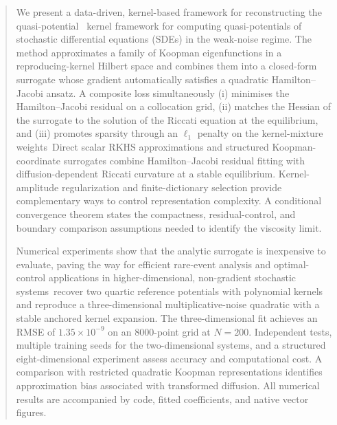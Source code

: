 \documentclass[11pt]{article}
\theoremstyle{plain}      %
\theoremstyle{definition} %
\providecommand{\DIFaddtex}[1]{{\protect\color{blue}#1}} %
\providecommand{\DIFdeltex}[1]{{\protect\color{red}#1}} %
\providecommand{\DIFaddbegin}{} %
\providecommand{\DIFaddend}{} %
\providecommand{\DIFdelbegin}{} %
\providecommand{\DIFdelend}{} %
\providecommand{\DIFadd}[1]{\texorpdfstring{\DIFaddtex{#1}}{#1}} %
\providecommand{\DIFdel}[1]{\texorpdfstring{\DIFdeltex{#1}}{}} %
\newcommand{\DIFscaledelfig}{1.0}
\newlength{\DIFdelgraphicswidth} %
\newlength{\DIFdelgraphicsheight} %
\newcommand{\DIFaddincludegraphics}[2][]{{\color{blue}\fbox{\DIFOincludegraphics[#1]{#2}}}} %
\newcommand{\DIFdelincludegraphics}[2][]{%
\sbox{\DIFdelgraphicsbox}{\DIFOincludegraphics[#1]{#2}}%
\settoboxwidth{\DIFdelgraphicswidth}{\DIFdelgraphicsbox} %
\settoboxtotalheight{\DIFdelgraphicsheight}{\DIFdelgraphicsbox} %
\scalebox{\DIFscaledelfig}{%
\parbox[b]{\DIFdelgraphicswidth}{\usebox{\DIFdelgraphicsbox}\\[-\baselineskip] \rule{\DIFdelgraphicswidth}{0em}}\llap{\resizebox{\DIFdelgraphicswidth}{\DIFdelgraphicsheight}{%
\setlength{\unitlength}{\DIFdelgraphicswidth}%
\begin{picture}(1,1)%
\thicklines\linethickness{2pt} %
{\color[rgb]{1,0,0}\put(0,0){\framebox(1,1){}}}%
{\color[rgb]{1,0,0}\put(0,0){\line( 1,1){1}}}%
{\color[rgb]{1,0,0}\put(0,1){\line(1,-1){1}}}%
\end{picture}%
}\hspace*{3pt}}} %
} %
\DeclareRobustCommand{\DIFaddbegin}{\DIFOaddbegin \let\includegraphics\DIFaddincludegraphics} %
\DeclareRobustCommand{\DIFaddend}{\DIFOaddend \let\includegraphics\DIFOincludegraphics} %
\DeclareRobustCommand{\DIFdelbegin}{\DIFOdelbegin \let\includegraphics\DIFdelincludegraphics} %
\DeclareRobustCommand{\DIFdelend}{\DIFOaddend \let\includegraphics\DIFOincludegraphics} %
\begin{document}
 
\begin{abstract}
We present a \DIFdelbegin \DIFdel{data-driven, kernel-based framework for reconstructing the quasi-potential }\DIFdelend\ \DIFaddbegin \DIFadd{kernel framework for computing quasi-potentials }\DIFaddend of stochastic differential equations \DIFdelbegin \DIFdel{(SDEs) }\DIFdelend in the weak-noise regime. \DIFdelbegin \DIFdel{The method approximates a family of Koopman eigenfunctions in a reproducing-kernel Hilbert space and combines them into a closed-form surrogate whose gradient automatically satisfies a quadratic Hamilton–Jacobi ansatz. A composite loss simultaneously (i) minimises the Hamilton–Jacobi residual on a collocation grid, (ii) matches the Hessian of the surrogate to the solution of the Riccati equation at the equilibrium, and (iii) promotes sparsity through an \(\ell_{1}\) penalty on the kernel-mixture weights}\DIFdelend\ \DIFaddbegin \DIFadd{Direct scalar RKHS approximations and structured Koopman-coordinate surrogates combine Hamilton--Jacobi residual fitting with diffusion-dependent Riccati curvature at a stable equilibrium. Kernel-amplitude regularization and finite-dictionary selection provide complementary ways to control representation complexity. A conditional convergence theorem states the compactness, residual-control, and boundary comparison assumptions needed to identify the viscosity limit}\DIFaddend .

Numerical experiments \DIFdelbegin \DIFdel{show that the analytic surrogate is inexpensive to evaluate, paving the way for efficient rare-event analysis and optimal-control applications in higher-dimensional, non-gradient stochastic systems}\DIFdelend\ \DIFaddbegin \DIFadd{recover two quartic reference potentials with polynomial kernels and reproduce a three-dimensional multiplicative-noise quadratic with a stable anchored kernel expansion. The three-dimensional fit achieves an RMSE of $1.35\times10^{-9}$ on an $8000$-point grid at $N=200$. Independent tests, multiple training seeds for the two-dimensional systems, and a structured eight-dimensional experiment assess accuracy and computational cost. A comparison with restricted quadratic Koopman representations identifies approximation bias associated with transformed diffusion. All numerical results are accompanied by code, fitted coefficients, and native vector figures}\DIFaddend .
\end{abstract}
\end{document}
